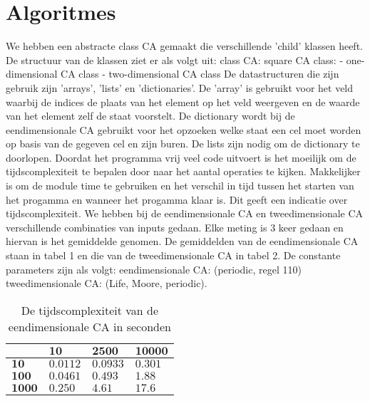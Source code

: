 \documentclass[12pt,a4paper]{article}
\begin{document}
\newpage
\section*{Algoritmes}
We hebben een abstracte class CA gemaakt die verschillende 'child' klassen heeft.
\newline
De structuur van de klassen ziet er als volgt uit:
\newline
\phantom{.}class CA:
\newline
\phantom{.}\hspace{12pt}square CA class:
\newline
\phantom{.}\hspace{24pt}- one-dimensional CA class
\newline
\phantom{.}\hspace{24pt}- two-dimensional CA class
\vspace{6pt}
\newline
De datastructuren die zijn gebruik zijn 'arrays', 'lists' en 'dictionaries'. 
De 'array' is gebruikt voor het veld waarbij de indices de plaats van het element op het veld weergeven en 
de waarde van het element zelf de staat voorstelt.
De dictionary wordt bij de eendimensionale CA gebruikt voor het opzoeken welke staat een cel moet worden op basis van de gegeven cel en zijn buren.
De lists zijn nodig om de dictionary te doorlopen.
\newline
Doordat het programma vrij veel code uitvoert is het moeilijk om 
de tijdscomplexiteit te bepalen door naar het aantal operaties te kijken.
Makkelijker is om de module time te gebruiken en het verschil in tijd tussen het starten van het progamma en wanneer het progamma klaar is.
Dit geeft een indicatie over tijdscomplexiteit.  
We hebben bij de eendimensionale CA en tweedimensionale CA verschillende combinaties van
inputs gedaan. Elke meting is 3 keer gedaan en hiervan is het gemiddelde genomen.
De gemiddelden van de eendimensionale CA staan in tabel 1 en die 
van de tweedimensionale CA in tabel 2. De constante parameters zijn als volgt:
\newline
eendimensionale CA: (periodic, regel 110)
\newline
tweedimensionale CA: (Life, Moore, periodic).

\begin{table*}
    \centering
    \begin{tabular}{|m{1.2cm}|m{2.0cm}|m{2.0cm}|m{2.0cm}|}
        \hline
        $\phantom{.}$ & $\textbf{10}$ & $\textbf{2500}$ & $\textbf{10000}$ \\
        \hline
        $\textbf{10}$ & $0.0112$ & $0.0933$ & $0.301$ \\
        \hline
        $\textbf{100}$ & $0.0461$ & $0.493$ & $1.88$ \\
        \hline
        $\textbf{1000}$ & $0.250$ & $4.61$ & $17.6$ \\
        \hline
    \end{tabular}
    \caption{De tijdscomplexiteit van de eendimensionale CA in seconden}
    \label{tbl:1dim}
\end{table*}
\end{document}

